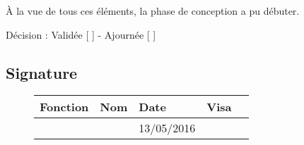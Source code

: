 \documentclass[asi, sansVersion]{picInsa}
\begin{document}
À la vue de tous ces éléments, la phase de conception a pu débuter.

\begin{center}
Décision : Validée [ \checkmark{} ] - Ajournée [ ]
\end{center}

\subsection*{Signature}
\begin{figure}[H]
		\centering
		\begin{tabularx}{17cm}{|p{4cm}|X|X|X|X|}
		\hline
		\rowcolor[gray]{0.85} Fonction & Nom & Date & Visa \\
		\hline
		\CP{} & \Sergi{} & 13/05/2016 & \\
		\hline
		\end{tabularx}
\end{figure}
\end{document}
